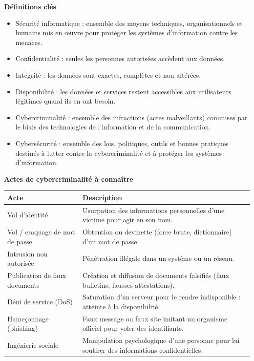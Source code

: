 \documentclass[11pt]{article}
\newcommand{\cle}[1]{{\popxbold\color{popdark}#1}}
\newcounter{popsec}
\newcounter{popsub}
\newcommand{\courssub}[1]{%
  \stepcounter{popsub}%
  \par\vspace{9pt}\noindent{\popxbold\fontsize{11.5}{13}\selectfont\color{popink}{\color{poporange}\thepopsec.\thepopsub}\hspace{6pt}#1}\par\nopagebreak\vspace{4pt}
}
\begin{document}
\courssub{L'essentiel à retenir}

\begin{bilan}
\textbf{Définitions clés}
\begin{itemize}
  \item \cle{Sécurité informatique} : ensemble des moyens techniques, organisationnels et humains mis en \oe uvre pour protéger les systèmes d'information contre les menaces.
  \item \cle{Confidentialité} : seules les personnes autorisées accèdent aux données.
  \item \cle{Intégrité} : les données sont exactes, complètes et non altérées.
  \item \cle{Disponibilité} : les données et services restent accessibles aux utilisateurs légitimes quand ils en ont besoin.
  \item \cle{Cybercriminalité} : ensemble des infractions (actes malveillants) commises par le biais des technologies de l'information et de la communication.
  \item \cle{Cybersécurité} : ensemble des lois, politiques, outils et bonnes pratiques destinés à lutter contre la cybercriminalité et à protéger les systèmes d'information.
\end{itemize}

\textbf{Actes de cybercriminalité à connaître}
\begin{center}
\begin{tabularx}{\linewidth}{|l|X|}
\hline
\rowcolor{popblueL} \textbf{Acte} & \textbf{Description} \\
\hline
Vol d'identité & Usurpation des informations personnelles d'une victime pour agir en son nom. \\
\hline
Vol / craquage de mot de passe & Obtention ou devinette (force brute, dictionnaire) d'un mot de passe. \\
\hline
Intrusion non autorisée & Pénétration illégale dans un système ou un réseau. \\
\hline
Publication de faux documents & Création et diffusion de documents falsifiés (faux bulletins, fausses attestations). \\
\hline
Déni de service (DoS) & Saturation d'un serveur pour le rendre indisponible : atteinte à la \cle{disponibilité}. \\
\hline
Hameçonnage (phishing) & Faux message ou faux site imitant un organisme officiel pour voler des identifiants. \\
\hline
Ingénierie sociale & Manipulation psychologique d'une personne pour lui soutirer des informations confidentielles. \\
\hline
\end{tabularx}
\end{center}


\end{bilan}
\end{document}
